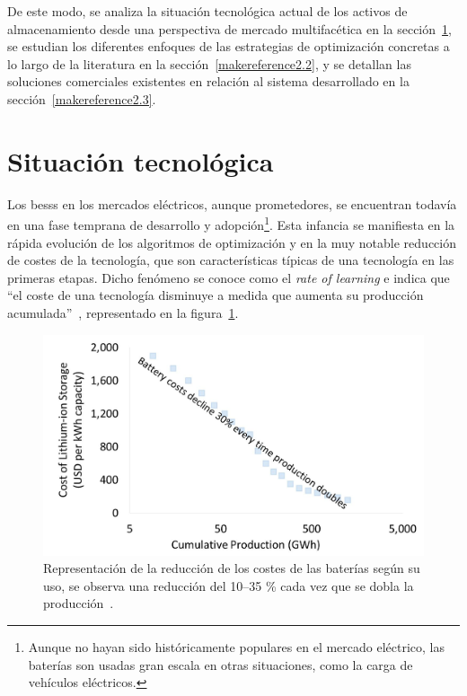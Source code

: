 De este modo, se analiza la situación tecnológica actual de los activos de almacenamiento desde una perspectiva de mercado multifacética en la sección~\ref{makereference2.1}, se estudian los diferentes enfoques de las estrategias de optimización concretas a lo largo de la literatura en la sección~\ref{makereference2.2}, y se detallan las soluciones comerciales existentes en relación al sistema desarrollado en la sección~\ref{makereference2.3}.

\section{Situación tecnológica}
\label{makereference2.1}

Los \glspl{bess} en los mercados eléctricos, aunque prometedores, se encuentran todavía en una fase temprana de desarrollo y adopción\footnote{Aunque no hayan sido históricamente populares en el mercado eléctrico, las baterías son usadas  gran escala en otras situaciones, como la carga de vehículos eléctricos.}. Esta infancia se manifiesta en la rápida evolución de los algoritmos de optimización y en la muy notable reducción de costes de la tecnología, que son características típicas de una tecnología en las primeras etapas. Dicho fenómeno se conoce como el \textit{rate of learning} e indica que ``el coste de una tecnología disminuye a medida que aumenta su producción acumulada''~\cite{mathew2021climate, louwen2018technological}, representado en la figura~\ref{fig:rate-of-learning}.

\begin{figure}
  \centering
  \includegraphics[width=0.75\linewidth]{figures/rate-of-learning.jpg}
  \caption[Reducción de los costes de las baterías por su uso.]{Representación de la reducción de los costes de las baterías según su uso, se observa una reducción del 10--35 \% cada vez que se dobla la producción~\cite{irena2025irena}.}
  \label{fig:rate-of-learning}
\end{figure}

